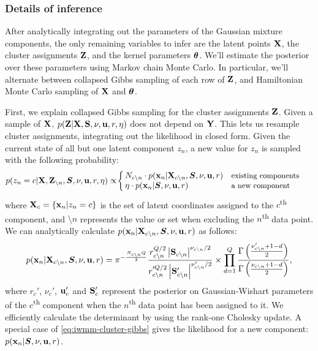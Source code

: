 \subsubsection{Details of inference}
\label{sec:iwmm-inference-details}

After analytically integrating out the parameters of the Gaussian mixture components, the only remaining variables to infer are the latent points $\mathbf{X}$, the cluster assignments $\mathbf{Z}$, and the kernel parameters ${\boldsymbol{\theta}}$.
We'll estimate the posterior over these parameters using Markov chain Monte Carlo.
In particular, we'll alternate between collapsed Gibbs sampling of each row of $\mathbf{Z}$, and Hamiltonian Monte Carlo sampling of $\mathbf{X}$ and ${\boldsymbol{\theta}}$.

First, we explain collapsed Gibbs sampling for the cluster assignments $\mathbf{Z}$.
Given a sample of $\mathbf{X}$, $p(\mathbf{Z} | \mathbf{X}, \mathbf{S}, \nu, {\bf{u}}, r, \eta)$ does not depend on $\mathbf{Y}$.
This lets us resample cluster assignments, integrating out the \iGMM{} likelihood in closed form.
Given the current state of all but one latent component $z_n$, a new value for $z_n$ is sampled with the following probability:
%
\begin{align}
p(z_{n}=c|\mathbf{X},\mathbf{Z}_{\setminus n},\bm{S},\nu,{\bf{u}},r,\eta)
 & \propto\!
\left\{
\begin{array}{ll}
\!\!N_{c\setminus n}\cdot p({\bf{x}}_{n}|\mathbf{X}_{c\setminus n},\bm{S},\nu,{\bf{u}},r) & \text{{\small existing components}}\\
\!\!\eta\cdot p({\bf{x}}_{n}|\bm{S},\nu,{\bf{u}},r) & \text{{\small a new component}}
\end{array}
\right.
\label{eq:gibbs}
\end{align}
%
where
$\mathbf{X}_{c}=\{{\bf{x}}_{n}|z_{n}=c\}$
is the set of latent coordinates assigned to the $c$\textsuperscript{th} component,
and $\setminus n$ represents the value or set when excluding the $n$\textsuperscript{th} data point.
We can analytically calculate $p({\bf{x}}_{n}|\mathbf{X}_{c\setminus n},\bm{S},\nu,{\bf{u}},r)$
as follows:
%
\begin{align}
p({\bf{x}}_{n}|\mathbf{X}_{c\setminus n},\bm{S},\nu,{\bf{u}},r)
=\pi^{-\frac{N_{c\setminus n}Q}{2}}
\frac{r_{c\setminus n} ^{Q/2} \left| \mathbf{S}_{c\setminus n}  \right|^{\nu_{c\setminus n}/2}}
     {r_{c\setminus n}'^{Q/2} \left| \mathbf{S}_{c\setminus n}' \right|^{\nu_{c\setminus n}'/2}}
\times \prod_{d=1}^{Q}
\frac{\Gamma \left( \frac{\nu_{c\setminus n}' + 1 - d}{2} \right)}
     {\Gamma \left( \frac{\nu_{c\setminus n}  + 1 - d}{2} \right)},
\label{eq:iwmm-cluster-gibbs}
\end{align}
%
where $r_{c}'$, $\nu_{c}'$, ${\bf{u}}_{c}'$ and $\mathbf{S}_{c}'$ represent the posterior on Gaussian-Wishart parameters of the $c$\textsuperscript{th} component when the $n$\textsuperscript{th} data point has been assigned to it.
We efficiently calculate the determinant by using the rank-one Cholesky update.
A special case of \cref{eq:iwmm-cluster-gibbs} gives the likelihood for a new component: $p({\bf{x}}_{n}|\bm{S},\nu,{\bf{u}},r)$.



